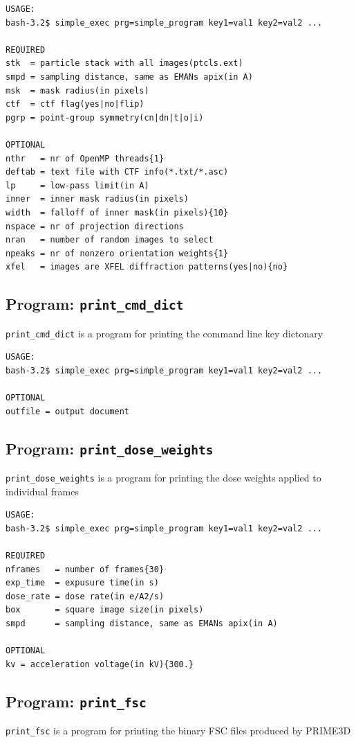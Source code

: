 \documentclass[a4paper,11pt]{article}
\newcommand{\prgname}[1]{\textcolor{NavyBlue}{\texttt{#1}}}
\begin{document}
\begin{verbatim}
USAGE:
bash-3.2$ simple_exec prg=simple_program key1=val1 key2=val2 ...

REQUIRED
stk  = particle stack with all images(ptcls.ext)
smpd = sampling distance, same as EMANs apix(in A)
msk  = mask radius(in pixels)
ctf  = ctf flag(yes|no|flip)
pgrp = point-group symmetry(cn|dn|t|o|i)

OPTIONAL
nthr   = nr of OpenMP threads{1}
deftab = text file with CTF info(*.txt/*.asc)
lp     = low-pass limit(in A)
inner  = inner mask radius(in pixels)
width  = falloff of inner mask(in pixels){10}
nspace = nr of projection directions
nran   = number of random images to select
npeaks = nr of nonzero orientation weights{1}
xfel   = images are XFEL diffraction patterns(yes|no){no}
\end{verbatim}

\subsection{Program: \prgname{print\_cmd\_dict}}
\label{print_cmd_dict}
\prgname{print\_cmd\_dict} is a program for printing the command line key dictonary

\begin{verbatim}
USAGE:
bash-3.2$ simple_exec prg=simple_program key1=val1 key2=val2 ...

OPTIONAL
outfile = output document
\end{verbatim}

\subsection{Program: \prgname{print\_dose\_weights}}
\label{print_dose_weights}
\prgname{print\_dose\_weights} is a program for printing the dose weights applied to individual frames

\begin{verbatim}
USAGE:
bash-3.2$ simple_exec prg=simple_program key1=val1 key2=val2 ...

REQUIRED
nframes   = number of frames{30}
exp_time  = expusure time(in s)
dose_rate = dose rate(in e/A2/s)
box       = square image size(in pixels)
smpd      = sampling distance, same as EMANs apix(in A)

OPTIONAL
kv = acceleration voltage(in kV){300.}
\end{verbatim}

\subsection{Program: \prgname{print\_fsc}}
\label{print_fsc}
\prgname{print\_fsc} is a program for printing the binary FSC files produced by PRIME3D
\end{document}
